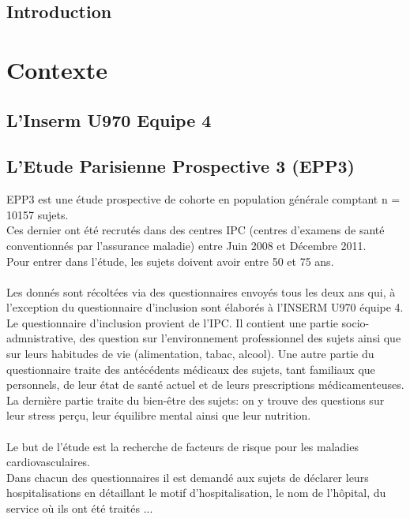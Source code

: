 \documentclass{book}
\begin{document}
\mainmatter


\newpage
\begin{center}
\section*{Introduction}
\end{center}


\newpage
\section{Contexte}
\subsection{L'Inserm U970 Equipe 4}
\subsection{L'Etude Parisienne Prospective 3 (EPP3)}
\noindent
EPP3 est une étude prospective de cohorte en population générale comptant n = 10157 sujets.\\
Ces dernier ont été recrutés dans des centres IPC (centres d'examens de santé conventionnés par l'assurance maladie) entre Juin 2008 et Décembre 2011.\\
Pour entrer dans l'étude, les sujets doivent avoir entre 50 et 75 ans.\\
\\
Les donnés sont récoltées via des questionnaires envoyés tous les deux ans qui, à l'exception du questionnaire d'inclusion sont élaborés à l'INSERM U970 équipe 4. \\
Le questionnaire d'inclusion provient de l'IPC. Il contient une partie socio-admnistrative, des question sur l'environnement professionnel des sujets ainsi que sur leurs habitudes de vie (alimentation, tabac, alcool). 
Une autre partie du questionnaire traite des antécédents médicaux des sujets, tant familiaux que personnels, de leur état de santé actuel et de leurs prescriptions médicamenteuses.
La dernière partie traite du bien-être des sujets: on y trouve des questions sur leur stress perçu, leur équilibre mental ainsi que leur nutrition.\\
\\
Le but de l'étude est la recherche de facteurs de risque pour les maladies cardiovasculaires.\\ 
Dans chacun des questionnaires il est demandé aux sujets de déclarer leurs hospitalisations en détaillant le motif d'hospitalisation, le nom de l'hôpital, du service où ils ont été traités ...
\end{document}
